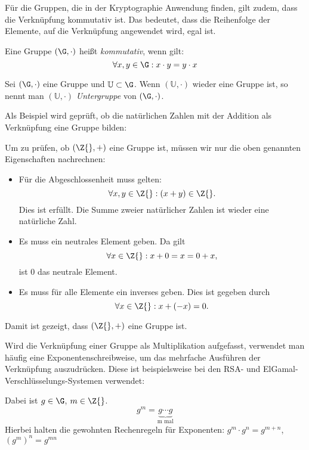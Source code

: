 Für die Gruppen, die in der Kryptographie Anwendung finden, gilt zudem,
dass die Verknüpfung kommutativ ist. Das bedeutet, dass die Reihenfolge
der Elemente, auf die Verknüpfung angewendet wird, egal ist.
\begin{definition}
  Eine Gruppe $(\G, \cdot)$ heißt \textit{kommutativ}, wenn gilt:
\[
  \forall x, y \in \G: x \cdot y = y \cdot x
\]
\end{definition}


\begin{definition}[Untergruppe]
  Sei $(\G, \cdot)$ eine Gruppe und $\mathbb{U} \subset \G$. Wenn
  $(\mathbb{U}, \cdot)$ wieder eine Gruppe ist, so nennt man $(\mathbb{U},
  \cdot)$ \textit{Untergruppe} von $(\G, \cdot)$.
\end{definition}


Als Beispiel wird geprüft, ob die natürlichen Zahlen mit der Addition
als Verknüpfung eine Gruppe bilden:
\begin{beispiel}
  Um zu prüfen, ob \((\Z{}, +)\) eine Gruppe ist, müssen
  wir nur die oben genannten Eigenschaften nachrechnen:
  \begin{itemize}
  \item Für die Abgeschlossenheit muss gelten: 
    \[\forall x, y \in \Z{}: (x+y)\in \Z{}. \] 
     Dies ist erfüllt. Die Summe zweier natürlicher Zahlen ist wieder
     eine natürliche Zahl.
  \item Es muss ein neutrales Element geben. Da gilt 
    \[\forall x \in \Z{}: x+0 = x = 0+x, \] ist $0$ das neutrale Element.
  \item Es muss für alle Elemente ein inverses geben. Dies ist gegeben
    durch \[\forall x \in \Z{}: x + (-x) = 0.\]
  \end{itemize}
  Damit ist gezeigt, dass $(\Z{}, +)$ eine Gruppe ist.
\end{beispiel}


Wird die Verknüpfung einer Gruppe als Multiplikation aufgefasst,
verwendet man häufig eine Exponentenschreibweise, um das mehrfache
Ausführen der Verknüpfung auszudrücken. Diese ist beispielsweise bei den
RSA- und ElGamal-Verschlüsselungs-Systemen verwendet:

\begin{definition}
 Dabei ist $g\in \G$, $m \in \Z{}$.
\[ g^m = \underbrace{g\cdots g}_{\text{m mal}} \]
Hierbei halten die gewohnten Rechenregeln für Exponenten: $g^m\cdot g^n =
g^{m+n}$, $(g^m)^n = g^{mn}$
\end{definition}

